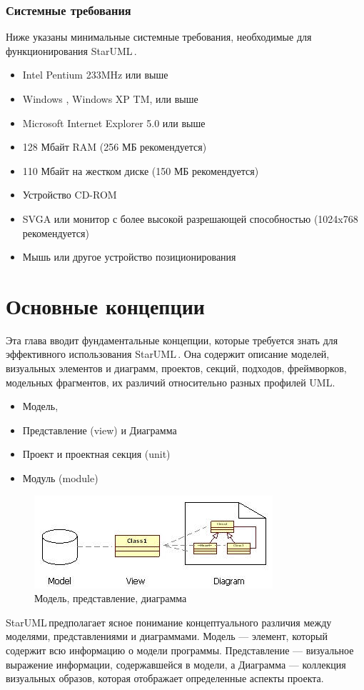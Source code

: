 \documentclass[a4paper,12pt]{report}
\newcommand{\staruml}{StarUML\,\tm}
\begin{document}
\subsection*{Системные требования}
Ниже указаны минимальные системные требования, необходимые для функционирования
\staruml.
\begin{itemize}
	\item Intel \reg Pentium \reg 233MHz или выше
	\item Windows , Windows XP TM, или выше
	\item Microsoft \reg Internet Explorer 5.0 или выше
	\item 128 Мбайт RAM (256 МБ рекомендуется)
	\item 110 Мбайт на жестком диске (150 МБ рекомендуется)
	\item Устройство CD-ROM
	\item SVGA или монитор с более высокой разрешающей способностью (1024x768 рекомендуется)
	\item Мышь или другое устройство позиционирования
\end{itemize}
\chapter{Основные концепции}
Эта глава вводит фундаментальные концепции, которые требуется знать для эффективного
использования \staruml. Она содержит описание моделей, визуальных элементов и диаграмм,
проектов, секций, подходов, фреймворков, модельных фрагментов, их различий относительно
разных профилей UML.
\begin{itemize}
	\item Модель,
	\item Представление (view) и Диаграмма
	\item Проект и проектная секция (unit)
	\item Модуль (module)
\end{itemize}

\begin{figure}[h!]
	\centering
	\includegraphics[width=0.7\linewidth]{images/modelviewdiagram}
	\caption{Модель, представление, диаграмма}
	\label{fig:modelviewdiagram}
\end{figure}
\staruml предполагает ясное понимание концептуального различия между моделями,
представлениями и диаграммами. Модель --- элемент, который содержит всю информацию о модели
программы. Представление --- визуальное выражение информации, содержавшейся в модели, а
Диаграмма --- коллекция визуальных образов, которая отображает определенные аспекты проекта.
\end{document}
